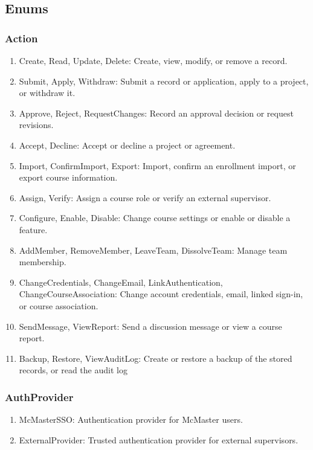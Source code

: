 \documentclass[12pt, titlepage]{article}
\begin{document}
\subsection{Enums}

\subsubsection{Action}
\begin{enumerate}
    \item Create, Read, Update, Delete: Create, view, modify, or remove a record.
    \item Submit, Apply, Withdraw: Submit a record or application, apply to a project, or withdraw it.
    \item Approve, Reject, RequestChanges: Record an approval decision or request revisions.
    \item Accept, Decline: Accept or decline a project or agreement.
    \item Import, ConfirmImport, Export: Import, confirm an enrollment import, or export course information.
    \item Assign, Verify: Assign a course role or verify an external supervisor.
    \item Configure, Enable, Disable: Change course settings or enable or disable a feature.
    \item AddMember, RemoveMember, LeaveTeam, DissolveTeam: Manage team membership.
    \item ChangeCredentials, ChangeEmail, LinkAuthentication, ChangeCourseAssociation: Change account credentials, email, linked sign-in, or course association.
    \item SendMessage, ViewReport: Send a discussion message or view a course report.
    \item Backup, Restore, ViewAuditLog: Create or restore a backup of the stored records, or read the audit log
\end{enumerate}

\subsubsection{AuthProvider}
\begin{enumerate}
    \item McMasterSSO: Authentication provider for McMaster users.
    \item ExternalProvider: Trusted authentication provider for external supervisors.
\end{enumerate}
\end{document}
